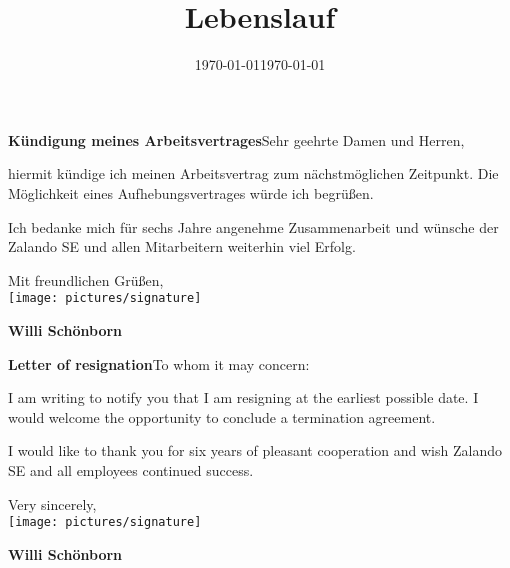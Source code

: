 \documentclass[11pt,a4paper,sans]{moderncv} %
\title{Lebenslauf}
\begin{document}


\clearpage

\date{\today} %
\opening{\textbf{Kündigung meines Arbeitsvertrages}\newline{}\newline{}Sehr geehrte Damen und Herren,} %
\closing{} %

\makelettertitle %

hiermit kündige ich meinen Arbeitsvertrag zum nächstmöglichen Zeitpunkt. Die Möglichkeit eines Aufhebungsvertrages würde ich begrüßen.
 
Ich bedanke mich für sechs Jahre angenehme Zusammenarbeit und wünsche der Zalando SE und allen Mitarbeitern weiterhin viel Erfolg.

Mit freundlichen Grüßen,\\[1.5em]
\texttt{[image: pictures/signature]}

\textbf{Willi Schönborn}

\clearpage
\begin{otherlanguage}{english}

\date{\today} %
\opening{\textbf{Letter of resignation}\newline{}\newline{}To whom it may concern:} %
\closing{} %

\makelettertitle %

I am writing to notify you that I am resigning at the earliest possible date. I would welcome the opportunity to conclude a termination agreement.

I would like to thank you for six years of pleasant cooperation and wish Zalando SE and all employees continued success.

Very sincerely,\\[1.5em]
\texttt{[image: pictures/signature]}

\textbf{Willi Schönborn}
\end{otherlanguage}


\end{document}
